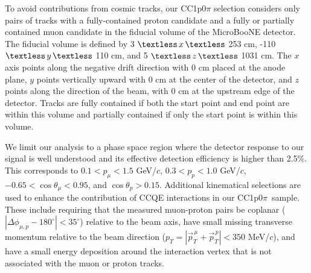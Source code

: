 \documentclass[aps,prl,showpacs,twocolumn,superscriptaddress,letterpaper,longbibliography]{revtex4-1}
\newcommand{\CCIpOpi}{CC1p0$\pi$}
\begin{document}
	To avoid contributions from cosmic tracks, our CC1p0$\pi$ selection considers only pairs of tracks with a fully-contained proton candidate 
	and a fully or partially contained muon candidate in the fiducial volume 
	of the MicroBooNE detector. 
	The fiducial volume is defined by 3  $\textless\,x\,\textless$ 253 cm, -110  $\textless\,y\,\textless$ 110  cm, and 5 $\textless\,z\,\textless$  1031 cm.
The  $x$ axis points  along  the  negative  drift  direction  with  $0$ cm  placed  at  the  anode  plane,  $y$ points vertically upward with $0$ cm at the center of the detector, and $z$ points  along  the  direction  of  the  beam,  with  $0$ cm  at  the  upstream edge of the detector.
Tracks are fully contained if both the start point and end point are within this volume and partially contained if only the start point is within this volume.


We limit our analysis to a phase space region where the detector response  to our signal is well understood
and its effective detection efficiency is higher than 2.5\%.
This corresponds to $0.1 < p_{\mu} < 1.5$  GeV/$c$, $0.3 < p_{p} < 1.0$ GeV/$c$,
$-0.65 < \cos\theta_{\mu} < 0.95$, and $\cos\theta_{p} >  0.15$.
Additional kinematical selections are used to enhance the contribution of CCQE interactions in our \CCIpOpi\ sample. These include requiring 
that the measured muon-proton pairs be coplanar ($|\Delta \phi_{\mu,p} - 180^\circ| < 35^\circ$) relative to the beam axis, 
have small missing transverse momentum relative to the beam direction ($p_T = |\vec{p}^{\,\mu}_T + \vec{p}^{\,p}_T| < 350$ MeV/$c$),
and have a small energy deposition around the interaction vertex that is not associated with the muon or proton tracks.
\end{document}

